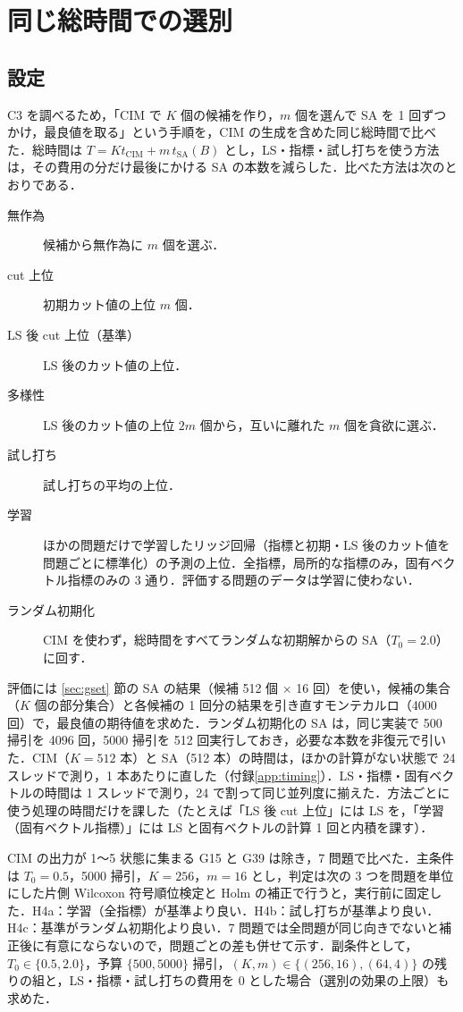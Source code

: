 \section{同じ総時間での選別}\label{sec:selection}

\subsection{設定}

C3 を調べるため，「CIM で $K$ 個の候補を作り，$m$ 個を選んで SA を 1 回ずつかけ，最良値を取る」という手順を，CIM の生成を含めた同じ総時間で比べた．総時間は $T=K t_{\mathrm{CIM}}+m\,t_{\mathrm{SA}}(B)$ とし，LS・指標・試し打ちを使う方法は，その費用の分だけ最後にかける SA の本数を減らした．比べた方法は次のとおりである．
\begin{description}
  \item[無作為] 候補から無作為に $m$ 個を選ぶ．
  \item[cut 上位] 初期カット値の上位 $m$ 個．
  \item[LS 後 cut 上位（基準）] LS 後のカット値の上位．
  \item[多様性] LS 後のカット値の上位 $2m$ 個から，互いに離れた $m$ 個を貪欲に選ぶ．
  \item[試し打ち] 試し打ちの平均の上位．
  \item[学習] ほかの問題だけで学習したリッジ回帰（指標と初期・LS 後のカット値を問題ごとに標準化）の予測の上位．全指標，局所的な指標のみ，固有ベクトル指標のみの 3 通り．評価する問題のデータは学習に使わない．
  \item[ランダム初期化] CIM を使わず，総時間をすべてランダムな初期解からの SA（$T_0=2.0$）に回す．
\end{description}

評価には \ref{sec:gset} 節の SA の結果（候補 512 個 × 16 回）を使い，候補の集合（$K$ 個の部分集合）と各候補の 1 回分の結果を引き直すモンテカルロ（4000 回）で，最良値の期待値を求めた．ランダム初期化の SA は，同じ実装で 500 掃引を 4096 回，5000 掃引を 512 回実行しておき，必要な本数を非復元で引いた．CIM（$K=512$ 本）と SA（512 本）の時間は，ほかの計算がない状態で 24 スレッドで測り，1 本あたりに直した（付録\ref{app:timing}）．LS・指標・固有ベクトルの時間は 1 スレッドで測り，24 で割って同じ並列度に揃えた．方法ごとに使う処理の時間だけを課した（たとえば「LS 後 cut 上位」には LS を，「学習（固有ベクトル指標）」には LS と固有ベクトルの計算 1 回と内積を課す）．

CIM の出力が 1〜5 状態に集まる G15 と G39 は除き，7 問題で比べた．主条件は $T_0=0.5$，5000 掃引，$K=256$，$m=16$ とし，判定は次の 3 つを問題を単位にした片側 Wilcoxon 符号順位検定と Holm の補正で行うと，実行前に固定した．H4a：学習（全指標）が基準より良い．H4b：試し打ちが基準より良い．H4c：基準がランダム初期化より良い．7 問題では全問題が同じ向きでないと補正後に有意にならないので，問題ごとの差も併せて示す．副条件として，$T_0\in\{0.5,2.0\}$，予算 $\{500,5000\}$ 掃引，$(K,m)\in\{(256,16),(64,4)\}$ の残りの組と，LS・指標・試し打ちの費用を 0 とした場合（選別の効果の上限）も求めた．


